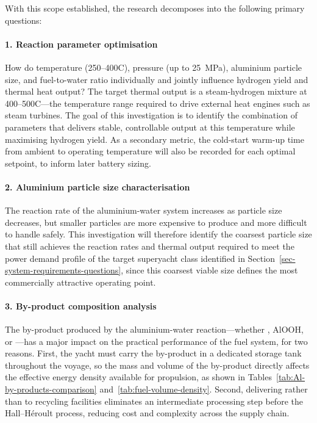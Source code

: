 \documentclass[12pt]{article}
\begin{document}
With this scope established, the research decomposes into the following primary 
questions:

\paragraph{1. Reaction parameter optimisation}

How do temperature (250--400\textdegree C), pressure (up to 25~MPa), aluminium 
particle size, and fuel-to-water ratio individually and jointly influence hydrogen 
yield and thermal heat output? The target thermal output is a steam-hydrogen mixture 
at 400--500\textdegree C---the temperature range required to drive external heat 
engines such as steam turbines. The goal of this investigation is to identify the 
combination of parameters that delivers stable, controllable output at this 
temperature while maximising hydrogen yield. As a secondary metric, the cold-start 
warm-up time from ambient to operating temperature will also be recorded for each 
optimal setpoint, to inform later battery sizing.

\paragraph{2. Aluminium particle size characterisation}

The reaction rate of the aluminium-water system increases as particle size decreases, 
but smaller particles are more expensive to produce and more difficult to handle 
safely. This investigation will therefore identify the coarsest particle size that 
still achieves the reaction rates and thermal output required to meet the power 
demand profile of the target superyacht class identified in Section~\ref{sec-system-requirements-questions}, 
since this coarsest viable size defines the most commercially attractive operating 
point.

\paragraph{3. By-product composition analysis}

The by-product produced by the aluminium-water reaction---whether , 
AlOOH, or ---has a major impact on the practical performance of the fuel 
system, for two reasons. First, the yacht must carry the by-product in a dedicated 
storage tank throughout the voyage, so the mass and volume of the by-product directly 
affects the effective energy density available for propulsion, as shown in 
Tables~\ref{tab:Al-by-products-comparison} and~\ref{tab:fuel-volume-density}. Second, delivering 
 rather than  to recycling facilities eliminates an 
intermediate processing step before the Hall--H\'{e}roult process, reducing cost 
and complexity across the supply chain.
\end{document}
